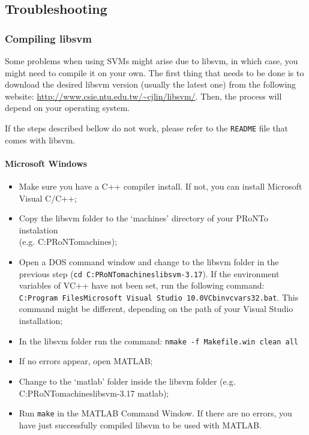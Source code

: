 \subsection{Troubleshooting}
\subsubsection{Compiling libsvm}
Some problems when using SVMs might arise due to  libsvm, in which case, you might need to compile it on your own. The first thing that needs to be done is to download the desired libsvm version (usually the latest one) from the following website: \url{http://www.csie.ntu.edu.tw/~cjlin/libsvm/}. Then, the process will depend on your operating system.

If the steps described bellow do not work, please refer to the {\tt README} file that comes with libsvm.

\paragraph{Microsoft Windows}
\begin{itemize}
    \item Make sure you have a C++ compiler install. If not, you can install Microsoft Visual C/C++;
    \item Copy the libsvm folder to the `machines' directory of your PRoNTo instalation\\(e.g. C:\bslash PRoNTo\bslash machines\bslash);
    \item Open a DOS command window and change to the libsvm folder in the previous step ({\tt cd C:\bslash PRoNTo\bslash machines\bslash libsvm-3.17\bslash}). If the environment variables of VC++ have not been set, run the following command:\\{\tt C:\bslash Program Files\bslash Microsoft Visual Studio 10.0\bslash VC\bslash bin\bslash vcvars32.bat}. This command might be different, depending on the path of your Visual Studio installation;
    \item In the libsvm folder run the command: {\tt nmake -f Makefile.win clean all} 
    \item If no errors appear, open MATLAB;
    \item Change to the `matlab' folder inside the libsvm folder (e.g. C:\bslash PRoNTo\bslash machines\bslash libsvm-3.17 \bslash matlab\bslash);
    \item Run {\tt make} in the MATLAB Command Window. If there are no errors, you have just successfully compiled libsvm to be used with MATLAB.
\end{itemize}

